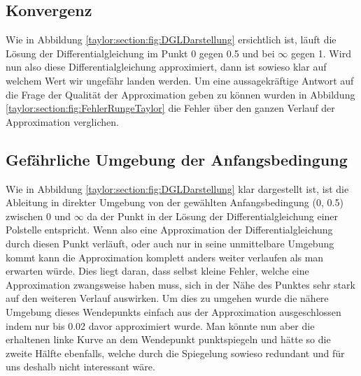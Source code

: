 \subsection{Konvergenz
\label{taylor:subsection:Konvergenz}}
%
Wie in Abbildung 
\ref{taylor:section:fig:DGLDarstellung}
ersichtlich ist, läuft die Lösung der Differentialgleichung im Punkt 0 gegen 0.5 und bei $\infty$ gegen 1.
Wird nun also diese Differentialgleichung approximiert, dann ist sowieso klar auf welchem Wert wir ungefähr landen werden.
Um eine aussagekräftige Antwort auf die Frage der Qualität der Approximation geben zu können wurden in Abbildung \ref{taylor:section:fig:FehlerRungeTaylor} die Fehler über den ganzen Verlauf der Approximation verglichen.

\subsection{Gefährliche Umgebung der Anfangsbedingung
\label{taylor:subsection:0Punkt}}
Wie in Abbildung 
\ref{taylor:section:fig:DGLDarstellung}
klar dargestellt ist, ist die Ableitung in direkter Umgebung von der gewählten Anfangsbedingung (0, 0.5) zwischen 0 und $\infty$ da der Punkt in der Lösung der Differentialgleichung einer Polstelle entspricht.
Wenn also eine Approximation der Differentialgleichung durch diesen Punkt verläuft, oder auch nur in seine unmittelbare Umgebung kommt kann die Approximation komplett anders weiter verlaufen als man erwarten würde.
Dies liegt daran, dass selbst kleine Fehler, welche eine Approximation zwangsweise haben muss, sich in der Nähe des Punktes sehr stark auf den weiteren Verlauf auswirken.
Um dies zu umgehen wurde die nähere Umgebung dieses Wendepunkts einfach aus der Approximation ausgeschlossen indem nur bis 0.02 davor approximiert wurde.
Man könnte nun aber die erhaltenen linke Kurve an dem Wendepunkt punktspiegeln und hätte so die zweite Hälfte ebenfalls, welche durch die Spiegelung sowieso redundant und für uns deshalb nicht interessant wäre.




